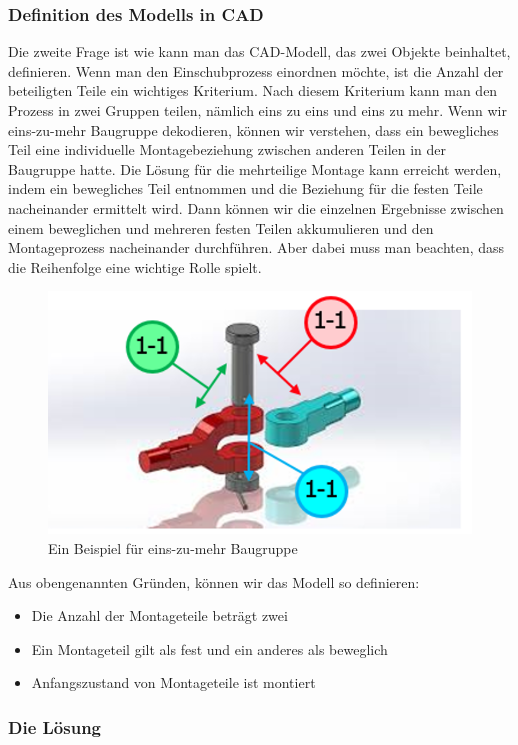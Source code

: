 \documentclass[14pt,a4paper,titlepage]{article}
\begin{document}
		\subsubsection{Definition des Modells in CAD}
		Die zweite Frage ist wie kann man das CAD-Modell, das zwei Objekte beinhaltet, definieren. Wenn man den Einschubprozess einordnen möchte, ist die Anzahl der beteiligten Teile ein wichtiges Kriterium. Nach diesem Kriterium kann man den Prozess in zwei Gruppen teilen, nämlich eins zu eins und eins zu mehr.  
		\bigbreak
		Wenn wir eins-zu-mehr Baugruppe dekodieren, können wir verstehen, dass ein bewegliches Teil eine individuelle Montagebeziehung zwischen anderen Teilen in der Baugruppe hatte. Die Lösung für die mehrteilige Montage kann erreicht werden, indem ein bewegliches Teil entnommen und die Beziehung für die festen Teile nacheinander ermittelt wird. Dann können wir die einzelnen Ergebnisse zwischen einem beweglichen und mehreren festen Teilen akkumulieren und den Montageprozess nacheinander durchführen. Aber dabei muss man beachten, dass die Reihenfolge eine wichtige Rolle spielt.\\
			\begin{figure}[h!]
			\centering
			\includegraphics[width=0.5\linewidth]{eins-zu-mehr.png}
			\caption{Ein Beispiel für eins-zu-mehr Baugruppe}
			\end{figure}
		Aus obengenannten Gründen, können wir das Modell so definieren:
			\begin{itemize}
				\item Die Anzahl der Montageteile beträgt zwei
				\item Ein Montageteil gilt als fest und ein anderes als beweglich
				\item Anfangszustand von Montageteile ist montiert
			\end{itemize}
		\subsubsection{Die Lösung}
\end{document}
